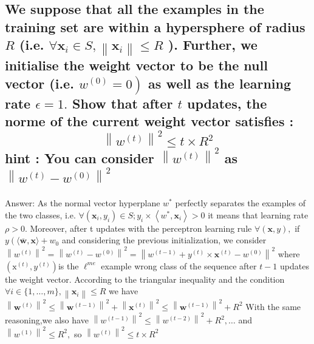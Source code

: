 \documentclass{article}
\begin{document}
\subsection{\textbf{We suppose that all the examples in the training set are within a hypersphere of radius $R$ (i.e. $\forall \mathbf{x}_{i} \in S,\left\|\mathbf{x}_{i}\right\| \leq R$ ). Further, we initialise the weight vector to be the null vector (i.e. $\left.w^{(0)}=0\right)$ as well as the learning rate $\epsilon=1 .$ Show that after $t$ updates, the norme of the current weight vector satisfies :
$$
\left\|w^{(t)}\right\|^{2} \leq t \times R^{2}
$$
hint : You can consider $\left\|w^{(t)}\right\|^{2}$ as $\left\|w^{(t)}-w^{(0)}\right\|^{2}$}}
Answer:\newline
As the normal vector hyperplane $w^{*}$ perfectly separates the examples of the two classes, i.e. $\forall\left(\mathbf{x}_{i}, y_{i}\right) \in S ; y_{i} \times\left\langle w^{*}, \mathbf{x}_{i}\right\rangle>0$ it means that learning rate $ \rho> 0. $ Moreover, after t updates with the perceptron learning rule $\forall(\mathbf{x}, y),$ if $y\left(\langle\overline{\boldsymbol{w}}, \mathbf{x}\rangle+w_{0}$  and considering the previous initialization, we consider 
\newline
$\left\|w^{(t)}\right\|^{2}=\left\|w^{(t)}-w^{(0)}\right\|^{2}=\left\|w^{(t-1)}+y^{(t)} \times \mathbf{x}^{(t)}-w^{(0)}\right\|^{2}$
\newline\newline
where $\left(\mathrm{x}^{(t)}, y^{(t)}\right)$is the $\ell^{m e}$ example wrong class of the sequence after $t-1$ updates the weight vector. According to the triangular inequality and the condition 
$\forall i \in\{1, \ldots, m\},\left\|\mathbf{x}_{i}\right\| \leqslant R$
\newline we have
\newline 
$\left\|\boldsymbol{w}^{(t)}\right\|^{2} \leqslant\left\|\boldsymbol{w}^{(t-1)}\right\|^{2}+\left\|\mathbf{x}^{(t)}\right\|^{2} \leqslant\left\|\boldsymbol{w}^{(t-1)}\right\|^{2}+R^{2}$
\newline 
\newline
With the same reasoning,we also have
\newline
\newline
$\left\|w^{(t-1)}\right\|^{2} \leqslant\left\|w^{(t-2)}\right\|^{2}+R^{2}, \ldots$ 
and $\left\|w^{(1)}\right\|^{2} \leqslant R^{2},$  
\newline
so
\newline 
$\left\|w^{(t)}\right\|^{2} \leqslant t \times R^{2}$
\end{document}
